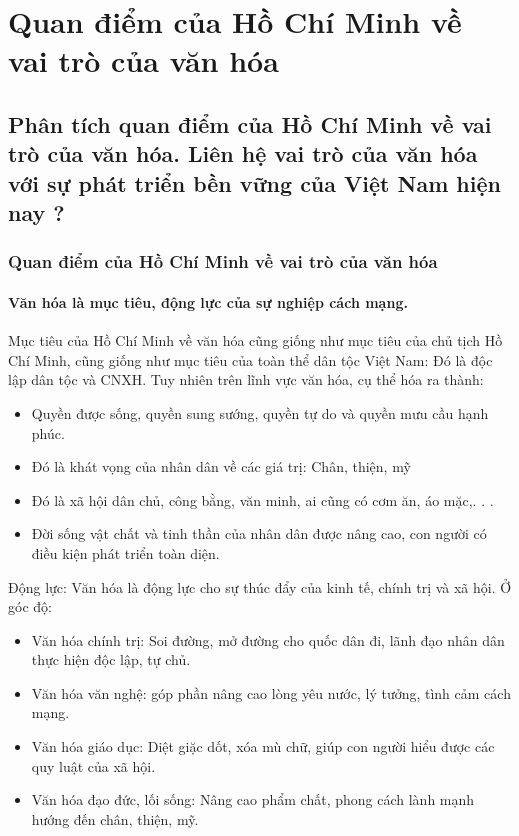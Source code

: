 \section{Quan điểm của Hồ Chí Minh về vai trò của văn hóa}

\subsection{Phân tích quan điểm của Hồ Chí Minh về vai trò của văn hóa. Liên hệ vai trò của văn hóa với sự phát triển bền vững của Việt Nam hiện nay ?}

\subsubsection{Quan điểm của Hồ Chí Minh về vai trò của văn hóa}

\paragraph{Văn hóa là mục tiêu, động lực của sự nghiệp cách mạng.}
Mục tiêu của Hồ Chí Minh về văn hóa cũng giống như mục tiêu của chủ tịch Hồ Chí Minh, cũng giống như mục tiêu của toàn thể dân tộc Việt Nam: Đó là độc lập dân tộc và CNXH. Tuy nhiên trên lĩnh vực văn hóa, cụ thể hóa ra thành:
\begin{itemize}
    \item Quyền được sống, quyền sung sướng, quyền tự do và quyền mưu cầu hạnh phúc.
    \item Đó là khát vọng của nhân dân về các giá trị: Chân, thiện, mỹ
    \item Đó là xã hội dân chủ, công bằng, văn minh, ai cũng có cơm ăn, áo mặc,. . .
    \item Đời sống vật chất và tinh thần của nhân dân được nâng cao, con người có điều kiện phát triển toàn diện.
\end{itemize} 
Động lực: Văn hóa là động lực cho sự thúc đẩy của kinh tế, chính trị và xã hội. Ở góc độ:
\begin{itemize}
    \item Văn hóa chính trị: Soi đường, mở đường cho quốc dân đi, lãnh đạo nhân dân thực hiện độc lập, tự chủ.
    \item Văn hóa văn nghệ: góp phần nâng cao lòng yêu nước, lý tưởng, tình cảm cách mạng.
    \item Văn hóa giáo dục: Diệt giặc dốt, xóa mù chữ, giúp con người hiểu được các quy luật của xã hội.
    \item Văn hóa đạo đức, lối sống: Nâng cao phẩm chất, phong cách lành mạnh hướng đến chân, thiện, mỹ.
\end{itemize}

